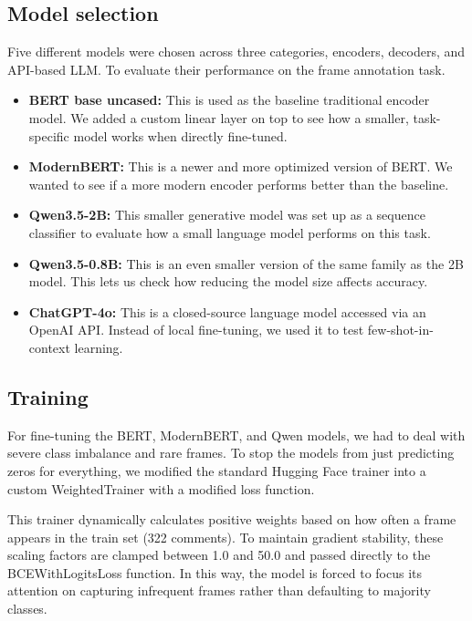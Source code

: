 \documentclass[
10pt, %
a4paper, %
oneside, %
headinclude,footinclude, %
] {book}%
\begin{document}
\subsection{Model selection}
Five different models were chosen  across three categories, encoders, decoders, and API-based LLM. To evaluate their performance on the frame annotation task. 
\begin{itemize}
    \item \textbf{BERT base uncased:} This is used as the baseline traditional encoder model. We added a custom linear layer on top to see how a smaller, task-specific model works when directly fine-tuned.
    
    \item \textbf{ModernBERT:} This is a newer and more optimized version of BERT. We wanted to see if a more modern encoder performs better than the baseline.
    
    \item \textbf{Qwen3.5-2B:} This smaller generative model was set up as a sequence classifier to evaluate how a small language model performs on this task.
    
    \item \textbf{Qwen3.5-0.8B:} This is an even smaller version of the same family as the 2B model. This lets us check how reducing the model size affects accuracy.

    \item \textbf{ChatGPT-4o:} This is a closed-source language model accessed via an OpenAI API. Instead of local fine-tuning, we used it to test few-shot-in-context learning.
\end{itemize}

\subsection{Training}
For fine-tuning the BERT, ModernBERT, and Qwen models, we had to deal with severe class imbalance and rare frames. To stop the models from just predicting zeros for everything, we modified the standard Hugging Face trainer into a custom WeightedTrainer with a modified loss function.

This trainer dynamically calculates positive weights based on how often a frame appears in the train set (322 comments). To maintain gradient stability, these scaling factors are clamped between 1.0 and 50.0 and passed directly to the BCEWithLogitsLoss function. In this way, the model is forced to focus its attention on capturing infrequent frames rather than defaulting to majority classes.\\
\end{document}
